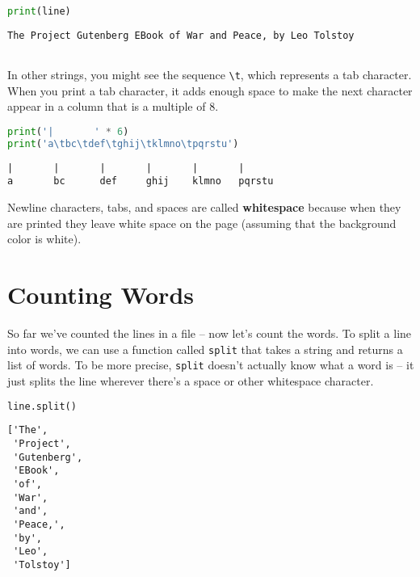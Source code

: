 \begin{lstlisting}[language=Python,style=source]
print(line)
\end{lstlisting}

\begin{lstlisting}[style=output]
The Project Gutenberg EBook of War and Peace, by Leo Tolstoy
	
\end{lstlisting}

In other strings, you might see the sequence
\passthrough{\lstinline!\\t!}, which represents a tab character. When
you print a tab character, it adds enough space to make the next
character appear in a column that is a multiple of 8.

\begin{lstlisting}[language=Python,style=source]
print('|       ' * 6)
print('a\tbc\tdef\tghij\tklmno\tpqrstu')
\end{lstlisting}

\begin{lstlisting}[style=output]
|       |       |       |       |       |
a       bc      def     ghij    klmno   pqrstu
\end{lstlisting}

Newline characters, tabs, and spaces are called \textbf{whitespace}
because when they are printed they leave white space on the page
(assuming that the background color is white).

\section{Counting Words}\label{counting-words}

So far we've counted the lines in a file -- now let's count the words.
To split a line into words, we can use a function called
\passthrough{\lstinline!split!} that takes a string and returns a list
of words. To be more precise, \passthrough{\lstinline!split!} doesn't
actually know what a word is -- it just splits the line wherever there's
a space or other whitespace character.

\begin{lstlisting}[language=Python,style=source]
line.split()
\end{lstlisting}

\begin{lstlisting}[style=output]
['The',
 'Project',
 'Gutenberg',
 'EBook',
 'of',
 'War',
 'and',
 'Peace,',
 'by',
 'Leo',
 'Tolstoy']
\end{lstlisting}

